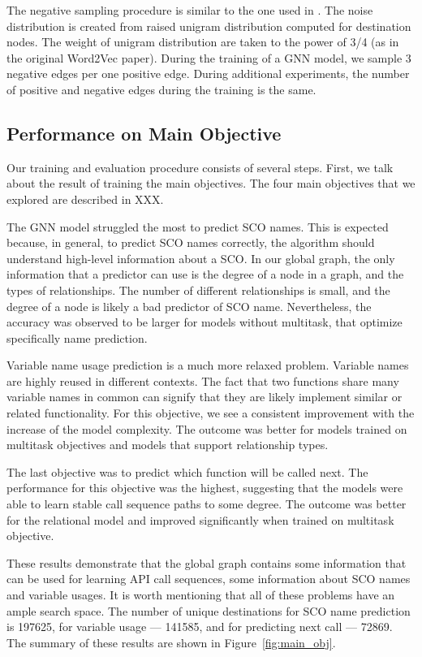 \documentclass[a4paper,twoside]{article}
\begin{document}
The negative sampling procedure is similar to the one used in \cite{mikolov2013distributed}. The noise distribution is created from raised unigram distribution computed for destination nodes. The weight of unigram distribution are taken to the power of 3/4 (as in the original Word2Vec paper). During the training of a GNN model, we sample 3 negative edges per one positive edge. During additional experiments, the number of positive and negative edges during the training is the same.

\subsection{Performance on Main Objective}

Our training and evaluation procedure consists of several steps. First, we talk about the result of training the main objectives. The four main objectives that we explored are described in XXX. 

The GNN model struggled the most to predict SCO names. This is expected because, in general, to predict SCO names correctly, the algorithm should understand high-level information about a SCO\@. In our global graph, the only information that a predictor can use is the degree of a node in a graph, and the types of relationships. The number of different relationships is small, and the degree of a node is likely a bad predictor of SCO name. Nevertheless, the accuracy was observed to be larger for models without multitask, that optimize specifically name prediction.

Variable name usage prediction is a much more relaxed problem. Variable names are highly reused in different contexts. The fact that two functions share many variable names in common can signify that they are likely implement similar or related functionality. For this objective, we see a consistent improvement with the increase of the model complexity. The outcome was better for models trained on multitask objectives and models that support relationship types.

The last objective was to predict which function will be called next. The performance for this objective was the highest, suggesting that the models were able to learn stable call sequence paths to some degree. The outcome was better for the relational model and improved significantly when trained on multitask objective. 

These results demonstrate that the global graph contains some information that can be used for learning API call sequences, some information about SCO names and variable usages. It is worth mentioning that all of these problems have an ample search space. The number of unique destinations for SCO name prediction is 197625, for variable usage --- 141585, and for predicting next call --- 72869. The summary of these results are shown in Figure~\ref{fig:main_obj}.
\end{document}
